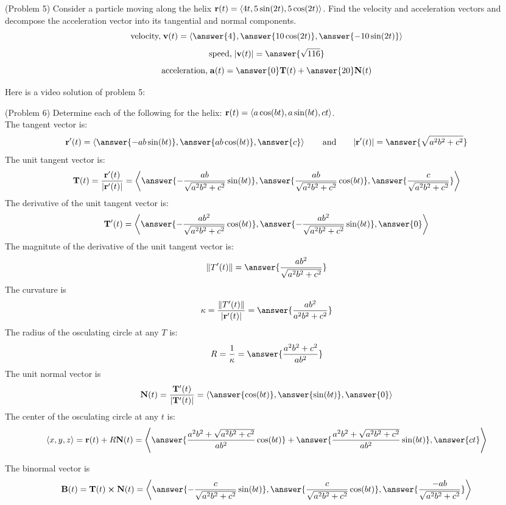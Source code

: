 \documentclass[handout]{ximera}
\begin{document}
\begin{problem}(Problem 5)
Consider a particle moving along the helix $\mathbf r(t) =  \left\langle 4t, 5 \sin(2t),5\cos(2t)\right\rangle$.
Find the velocity and acceleration vectors and decompose the acceleration vector into its tangential and normal components.\\
\[
\text{velocity,} \; \vec v(t) = \vector{\answer{4},\answer{10\cos(2t)},\answer{-10\sin(2t)}}
\]
\[
\text{speed,} \;  |\vec v(t)| = \answer{\sqrt{116}}
\]
\[
\text{acceleration,} \;  \vec a(t) = \answer{0} \vec T(t) + \answer{20} \vec N(t)
\]

\end{problem}

Here is a video solution of problem 5:\\

\begin{foldable}
\end{foldable}

\begin{problem}(Problem 6)
    Determine each of the following for the helix:  $\mathbf r(t) = \left\langle a\cos(bt), a\sin(bt), ct\right\rangle$. \\
    The tangent vector is:
    \[
    \vec r'(t) = \vector{\answer{-ab\sin(bt)}, \answer{ab\cos(bt)}, \answer{c}} \qquad\mbox{and}\qquad |\vec r'(t)| = \answer{\sqrt{a^2b^2 + c^2}}
    \]
    The unit tangent vector is: 
    \[
    \vec T(t) = \frac{\vec r'(t)}{|\vec r'(t)|} = \vector{\answer{-\frac{ab}{\sqrt{a^2b^2 + c^2}}\sin(bt)}, 
    \answer{\frac{ab}{\sqrt{a^2b^2 + c^2}}\cos(bt)}, \answer{\frac{c}{\sqrt{a^2b^2 + c^2}}}}
    \]
    The derivative of the unit tangent vector is:
    \[
    \vec T'(t) = \vector{\answer{-\frac{a b^2}{\sqrt{a^2b^2 + c^2}}\cos(bt)}, \answer{-\frac{a b^2}{\sqrt{a^2b^2 + c^2}}\sin(bt)}, \answer{0}}
    \]
    The magnitute of the derivative of the unit tangent vector is:
    \[
    \|T'(t)\| = \answer{\frac{a b^2}{\sqrt{a^2b^2 + c^2}}}
    \]
    The curvature is
    \[
    \kappa = \frac{\|T'(t)\|}{|\vec r'(t)|} = \answer{\frac{ab^2}{a^2b^2 + c^2}}
    \]
    The radius of the osculating circle at any $T$ is:
     \[
        R = \frac{1}{\kappa} = \answer{\frac{a^2b^2 + c^2}{ab^2}}   
        \]
    The unit normal vector is
     \[
     \vec N(t) = \frac{\vec T'(t)}{|\vec T'(t)|}= \vector{\answer{\cos(bt)}, \answer{\sin(bt)}, \answer{0}}
     \]
    The center of the osculating circle at any $t$ is:
    \[
    \vector{x, y, z}= \vec r(t) + R\vec N(t) = \vector{\answer{\frac{a^2b^2+\sqrt{a^2b^2 + c^2}}{ab^2}\cos(bt)} + \answer{\frac{a^2b^2+\sqrt{a^2b^2 + c^2}}{ab^2}\sin(bt)}, \answer{ct}}
    \]
    
    The binormal vector is
     \[
     \vec B(t)=\vec T(t)\cross \vec N(t) = \vector{\answer{-\frac{c}{\sqrt{a^2b^2 + c^2}}\sin(bt)}, \answer{\frac{c}{\sqrt{a^2b^2 + c^2}}\cos(bt)}, \answer{\frac{-ab}{\sqrt{a^2b^2 + c^2}}}}
     \]
\end{problem}
\end{document}
